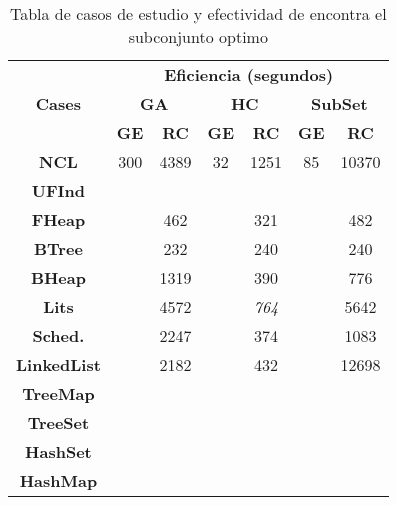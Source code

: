 \begin{table}[t]
\centering
\label{tab:t1}
\scriptsize
\begin{tabular}{|c c|cc|cc|cc|}
\midrule
\multicolumn{2}{|c|}{\multirow{3}{*}{\textbf{Cases}}} & \multicolumn{6}{c|}{\textbf{Eficiencia (segundos)}} \\
\cline{3-8}
\multicolumn{2}{|c|}{} & \multicolumn{2}{c}{\textbf{GA}} & \multicolumn{2}{c}{\textbf{HC}} & \multicolumn{2}{c|}{\textbf{SubSet}} \\
\multicolumn{2}{|c|}{} & \textbf{\tiny{GE}} & \textbf{\tiny{RC}} & \textbf{\tiny{GE}} & \textbf{\tiny{RC}} & \textbf{\tiny{GE}} & \textbf{\tiny{RC}} \\
\midrule
\multicolumn{2}{|c|}{\textbf{NCL}} & 300  & 4389   & 32 &  1251 &85 & 10370 \\
\midrule
\multicolumn{2}{|c|}{\textbf{UFInd}}&   &   &   &   &   &      \\
\midrule

\multicolumn{2}{|c|}{\textbf{FHeap}} &   & 462  &   &321   &   &  482   \\
\midrule

\multicolumn{2}{|c|}{\textbf{BTree}} &   &  232 &   & 240   &   & 240   \\
\midrule

\multicolumn{2}{|c|}{\textbf{BHeap}} &   &  1319 &   & 390  &   &  776   \\
\midrule

\multicolumn{2}{|c|}{\textbf{Lits}} &   & 4572  &   &  \emph{764} &   & 5642   \\
\midrule

\multicolumn{2}{|c|}{\textbf{Sched.}} &   & 2247  &   & 374  &   &1083    \\

\midrule
\multicolumn{2}{|c|}{\textbf{LinkedList}} &  &  2182 &   &  432 &  &  12698  \\
\midrule

\multicolumn{2}{|c|}{\textbf{TreeMap}} &   &   &   &   &   &     \\
\midrule

\multicolumn{2}{|c|}{\textbf{TreeSet}} &   &   &   &   &   &    \\
\midrule

\multicolumn{2}{|c|}{\textbf{HashSet}} &   &   &   &   &   &    \\
\midrule

\multicolumn{2}{|c|}{\textbf{HashMap}} &   &   &   &   &   &    \\
\hline
\end{tabular}

\caption{Tabla de casos de estudio y efectividad de encontra el subconjunto optimo}
\label{tab:eficiencia}
\end{table}

